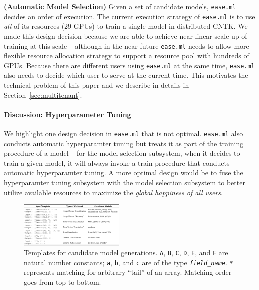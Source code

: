 \documentclass[letterpaper]{vldb}
\newcommand{\eml}{\texttt{ease.ml}\xspace}
\begin{document}
\vspace{0.5em}
\noindent
{\bf (Automatic Model Selection)} 
Given a set of candidate models, \eml decides an order of
execution. The current execution strategy of \eml is to 
use {\em all} of its resources (29 GPUs) to train a single 
model in distributed CNTK. We made this design decision 
because we are able to achieve near-linear scale up
of training at this scale -- although in the near 
future \eml needs to allow more flexible resource 
allocation strategy to support a resource pool 
with hundreds of GPUs. Because there are different
users using \eml at the same time, \eml also needs
to decide which user to serve at the current time.
This motivates the technical problem of this paper
and we describe in details in Section~\ref{sec:multitenant}.

\paragraph*{Discussion: Hyperparameter Tuning}
We highlight one design decision in \eml
that is not optimal. \eml also conducts automatic
hyperparamter tuning but treats it as part of the
training procedure of a model -- for the model selection
subsystem, when it decides to train a given model,
it will always invoke a train procedure that conducts
automatic hyperparamter tuning. A more optimal design 
would be to fuse the hyperparamter tuning subsystem
with the model selection subsystem to better
utilize available resources to maximize the
{\em global happiness of all users}.






\begin{figure}[t]
\centering
\includegraphics[width=0.45\textwidth]{figures/models}
\vspace{-1em}
\caption{Templates for candidate model generations. \texttt{A},
\texttt{B}, \texttt{C}, \texttt{D}, \texttt{E}, and \texttt{F}
are natural number constants; \texttt{a}, \texttt{b}, and \texttt{c} are of the type \texttt{\em field\_name}. \texttt{*} represents
matching for arbitrary ``tail'' of an array. Matching order
goes from top to bottom.}
\label{fig:templates}
\vspace{-1em}
\end{figure}
\end{document}
